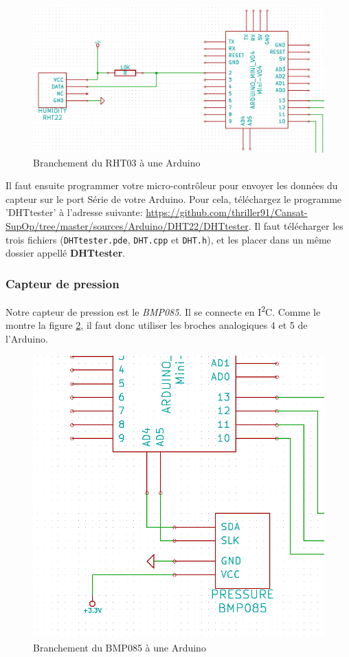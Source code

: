 \documentclass[twocolumn, 8pt]{article}
\begin{document}
\begin{figure}[!h]
	\centering
	\includegraphics[scale=.2]{RHT03.png}
	\caption{Branchement du RHT03 à une Arduino}
	\label{RHT03}
\end{figure}

\par Il faut ensuite programmer votre micro-contrôleur pour envoyer les données du capteur sur le port Série de votre Arduino. Pour cela, téléchargez le programme \textsf{'DHTtester'} à l'adresse suivante: \url{https://github.com/thriller91/Cansat-SupOp/tree/master/sources/Arduino/DHT22/DHTtester}. Il faut télécharger les trois fichiers (\texttt{DHTtester.pde}, \texttt{DHT.cpp} et \texttt{DHT.h}), et les placer dans un même dossier appellé \textbf{DHTtester}.

\subsubsection{Capteur de pression}
\par Notre capteur de pression est le \emph{BMP085}. Il se connecte en I\textsuperscript{2}C. Comme le montre la figure \ref{BMP085}, il faut donc utiliser les broches analogiques \no{}4 et 5 de l'Arduino.

\begin{figure}[!h]
	\centering
	\includegraphics[scale=.2]{BMP085.png}
	\caption{Branchement du BMP085 à une Arduino}
	\label{BMP085}
\end{figure}
\end{document}
